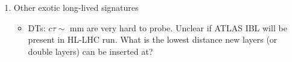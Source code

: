 \begin{enumerate}
\item Other exotic long-lived signatures
	\begin{itemize}
	\item DTs: $c \tau \sim $ mm are very hard to probe. Unclear if ATLAS IBL will be present in HL-LHC run. What is the lowest distance new layers (or double layers) can be inserted at?
	\end{itemize}



\end{enumerate}


%
%
%
%
%
